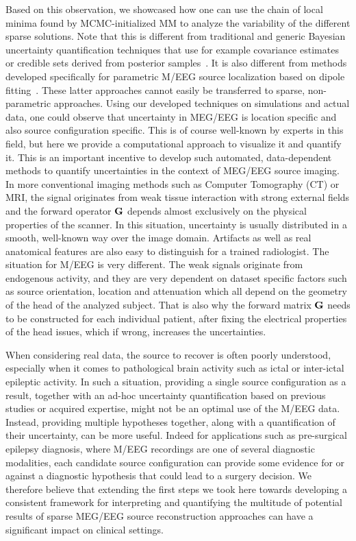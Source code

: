 Based on this observation, we showcased how one can use the chain of local minima found by MCMC-initialized MM to analyze the variability of the different sparse solutions. Note that this is different from traditional and generic Bayesian uncertainty quantification techniques that use for example covariance estimates or credible sets derived from posterior samples~\cite{szabo2015frequentist}. It is also different from methods developed specifically for parametric M/EEG source localization based on dipole fitting~\cite{Fuchs20041442,Darvas2005355}. These latter approaches cannot easily be transferred to sparse, non-parametric approaches. Using our developed techniques on simulations and actual data, one could observe that uncertainty in MEG/EEG is location specific and also source configuration specific. This is of course well-known by experts in this field, but here we provide a computational approach to visualize it and quantify it.
This is an important incentive to develop such automated, data-dependent methods to quantify uncertainties in the context of MEG/EEG source imaging. In more conventional imaging methods such as Computer Tomography (CT) or \ac{MRI}, the signal originates from weak tissue interaction with strong external fields and the forward operator $\mathbf{G}$ depends almost exclusively on the physical properties of the scanner. In this situation, uncertainty is usually distributed in a smooth, well-known way over the image domain. Artifacts as well as real anatomical features are also easy to distinguish for a trained radiologist. The situation for M/EEG is very different. The weak signals originate from endogenous activity, and they are very dependent on dataset specific factors such as source orientation, location and attenuation which all depend on the geometry of the head of the analyzed subject. That is also why the forward matrix $\mathbf{G}$ needs to be constructed for each individual patient, after fixing the electrical properties of the head issues, which if wrong, increases the uncertainties.

When considering real data, the source to recover is often poorly understood, especially when it comes to pathological brain activity such as ictal or inter-ictal epileptic activity. In such a situation, providing a single source configuration as a result, together with an ad-hoc uncertainty quantification based on previous studies or acquired expertise, might not be an optimal use of the M/EEG data.
Instead, providing multiple hypotheses together, along with a quantification of their uncertainty, can be more useful. Indeed for applications such as pre-surgical epilepsy diagnosis, where M/EEG recordings are one of several diagnostic modalities, each candidate source configuration can provide some evidence for or against a diagnostic hypothesis that could lead to a surgery decision.
We therefore believe that extending the first steps we took here towards developing a consistent framework for interpreting and quantifying the multitude of potential results of sparse MEG/EEG source reconstruction approaches can have a significant impact on clinical settings.
